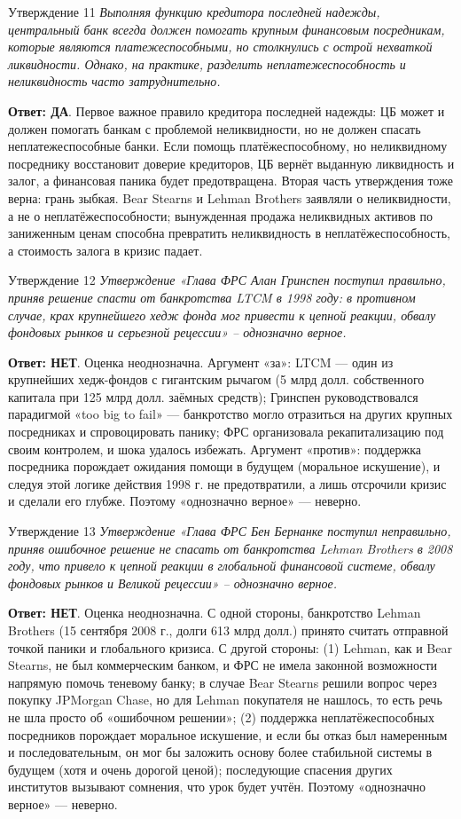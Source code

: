 \documentclass[10pt,a4paper]{article}
\newcommand{\qda}{\textbf{\color{yesgreen}Ответ: ДА}}
\newcommand{\qnet}{\textbf{\color{nored}Ответ: НЕТ}}
\newenvironment{answer}[2]{%
  \begin{qbox}{Утверждение #1}
  \textit{#2}\par\smallskip
}{%
  \end{qbox}\vspace{2pt}
}
\begin{document}
\begin{answer}{11}{Выполняя функцию кредитора последней надежды, центральный банк всегда должен помогать крупным финансовым посредникам, которые являются платежеспособными, но столкнулись с острой нехваткой ликвидности. Однако, на практике, разделить неплатежеспособность и неликвидность часто затруднительно.}
\qda. Первое важное правило кредитора последней надежды: ЦБ может и должен помогать банкам с проблемой неликвидности, но не должен спасать неплатежеспособные банки. Если помощь платёжеспособному, но неликвидному посреднику восстановит доверие кредиторов, ЦБ вернёт выданную ликвидность и залог, а финансовая паника будет предотвращена. Вторая часть утверждения тоже верна: грань зыбкая. Bear Stearns и Lehman Brothers заявляли о неликвидности, а не о неплатёжеспособности; вынужденная продажа неликвидных активов по заниженным ценам способна превратить неликвидность в неплатёжеспособность, а стоимость залога в кризис падает.
\end{answer}

\begin{answer}{12}{Утверждение «Глава ФРС Алан Гринспен поступил правильно, приняв решение спасти от банкротства LTCM в 1998 году: в противном случае, крах крупнейшего хедж фонда мог привести к цепной реакции, обвалу фондовых рынков и серьезной рецессии» -- однозначно верное.}
\qnet. Оценка неоднозначна. Аргумент «за»: LTCM --- один из крупнейших хедж-фондов с гигантским рычагом (5 млрд долл. собственного капитала при 125 млрд долл. заёмных средств); Гринспен руководствовался парадигмой «too big to fail» --- банкротство могло отразиться на других крупных посредниках и спровоцировать панику; ФРС организовала рекапитализацию под своим контролем, и шока удалось избежать. Аргумент «против»: поддержка посредника порождает ожидания помощи в будущем (моральное искушение), и следуя этой логике действия 1998 г. не предотвратили, а лишь отсрочили кризис и сделали его глубже. Поэтому «однозначно верное» --- неверно.
\end{answer}

\begin{answer}{13}{Утверждение «Глава ФРС Бен Бернанке поступил неправильно, приняв ошибочное решение не спасать от банкротства Lehman Brothers в 2008 году, что привело к цепной реакции в глобальной финансовой системе, обвалу фондовых рынков и Великой рецессии» -- однозначно верное.}
\qnet. Оценка неоднозначна. С одной стороны, банкротство Lehman Brothers (15 сентября 2008 г., долги 613 млрд долл.) принято считать отправной точкой паники и глобального кризиса. С другой стороны: (1) Lehman, как и Bear Stearns, не был коммерческим банком, и ФРС не имела законной возможности напрямую помочь теневому банку; в случае Bear Stearns решили вопрос через покупку JPMorgan Chase, но для Lehman покупателя не нашлось, то есть речь не шла просто об «ошибочном решении»; (2) поддержка неплатёжеспособных посредников порождает моральное искушение, и если бы отказ был намеренным и последовательным, он мог бы заложить основу более стабильной системы в будущем (хотя и очень дорогой ценой); последующие спасения других институтов вызывают сомнения, что урок будет учтён. Поэтому «однозначно верное» --- неверно.
\end{answer}
\end{document}
